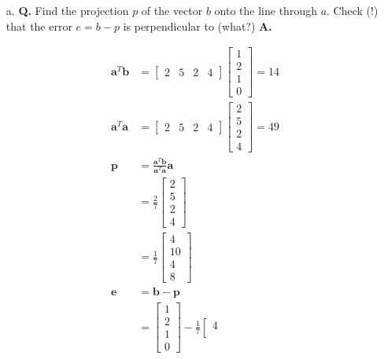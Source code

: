 \documentclass[main.tex]{subfiles}
\begin{document}
\begin{enumerate}
\begin{enumerate}
    \item [a.] \textbf{Q.} Find the projection $p$ of the vector $b$ onto the line through $a$. Check (!) that the error $e=b-p$ is perpendicular to (what?)
    \textbf{A.}

    $$
    \begin{aligned}
    \bm{a}^T \bm{b} &= \left[\begin{array}{llll} 2 & 5 & 2 & 4 \end{array}\right]
    \left[\begin{array}{l}
    1 \\
    2 \\
    1 \\
    0
    \end{array}\right] = 14\\
    \bm{a}^T \bm{a} &= \left[\begin{array}{llll} 2 & 5 & 2 & 4 \end{array}\right]
    \left[\begin{array}{l}
    2 \\
    5 \\
    2 \\
    4
    \end{array}\right] = 49\\
    \boldsymbol{p}&=\frac{\boldsymbol{a}^{T} \boldsymbol{b}}{\boldsymbol{a}^{T} \boldsymbol{a}} \boldsymbol{a}\\
    & = \frac{2}{7} \left[\begin{array}{l}
    2 \\
    5 \\
    2 \\
    4
    \end{array}\right] \\
    & = \frac{1}{7}\left[\begin{array}{l}
    4 \\
    10 \\
    4 \\
    8
    \end{array}\right] \\
    \bm{e} &= \bm{b} - \bm{p} \\
    & = \left[\begin{array}{l}
    1 \\
    2 \\
    1 \\
    0
    \end{array}\right] - \frac{1}{7}\left[\begin{array}{l}
    4 \\

\end{array}
\end{aligned}$$
\end{enumerate}
\end{enumerate}
\end{document}
